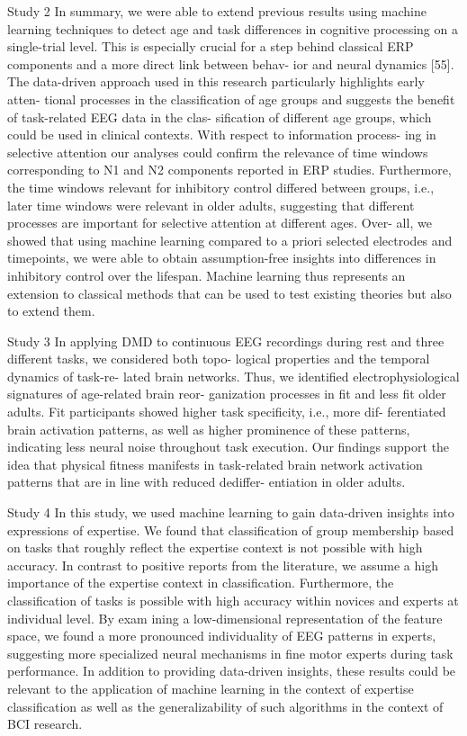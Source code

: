 Study 2
In summary, we were able to extend previous results
using machine learning techniques to detect age and
task differences in cognitive processing on a single-trial
level. This is especially crucial for a step behind classical
ERP components and a more direct link between behav-
ior and neural dynamics [55]. The data-driven approach
used in this research particularly highlights early atten-
tional processes in the classification of age groups and
suggests the benefit of task-related EEG data in the clas-
sification of different age groups, which could be used in
clinical contexts. With respect to information process-
ing in selective attention our analyses could confirm the
relevance of time windows corresponding to N1 and N2
components reported in ERP studies. Furthermore, the
time windows relevant for inhibitory control differed
between groups, i.e., later time windows were relevant
in older adults, suggesting that different processes are
important for selective attention at different ages. Over-
all, we showed that using machine learning compared
to a priori selected electrodes and timepoints, we were
able to obtain assumption-free insights into differences
in inhibitory control over the lifespan. Machine learning
thus represents an extension to classical methods that
can be used to test existing theories but also to extend
them.

Study 3 
In applying DMD to continuous EEG recordings during
rest and three different tasks, we considered both topo-
logical properties and the temporal dynamics of task-re-
lated
brain
networks.
Thus, we
identified electrophysiological signatures of age-related brain reor-
ganization processes in fit and less fit older adults. Fit
participants showed higher task specificity, i.e., more dif-
ferentiated brain activation patterns, as well as higher
prominence of these patterns, indicating less neural noise
throughout task execution. Our findings support the idea
that physical fitness manifests in task-related brain network
activation patterns that are in line with reduced dediffer-
entiation in older adults.

Study 4
In this study, we used machine learning to gain data-driven insights
into expressions of expertise. We found that classification of group
membership based on tasks that roughly reflect the expertise context is
not possible with high accuracy. In contrast to positive reports from the
literature, we assume a high importance of the expertise context in
classification. Furthermore, the classification of tasks is possible with
high accuracy within novices and experts at individual level. By exam­
ining a low-dimensional representation of the feature space, we found a
more pronounced individuality of EEG patterns in experts, suggesting
more specialized neural mechanisms in fine motor experts during task
performance. In addition to providing data-driven insights, these results
could be relevant to the application of machine learning in the context of
expertise classification as well as the generalizability of such algorithms
in the context of BCI research.

